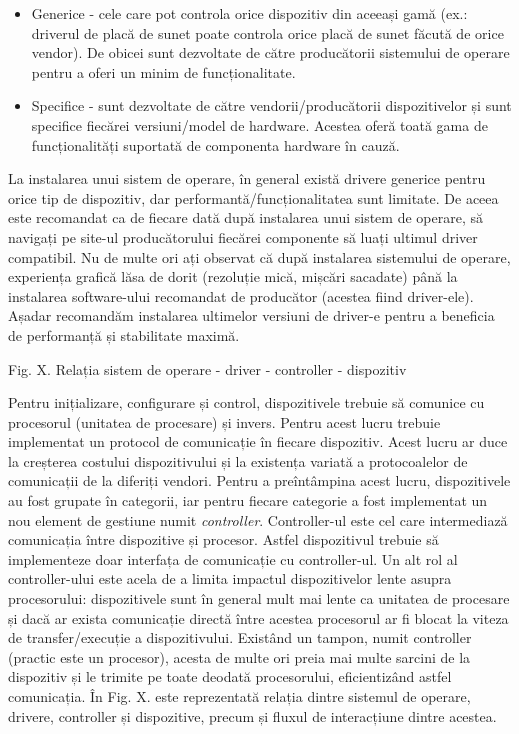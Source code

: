 \begin{itemize}
	\item Generice - cele care pot controla orice dispozitiv din aceeași
		gamă (ex.: driverul de placă de sunet poate controla orice placă
		de sunet făcută de orice vendor). De obicei sunt dezvoltate de
		către producătorii sistemului de operare pentru a oferi un minim
		de funcționalitate.
	\item Specifice - sunt dezvoltate de către vendorii/producătorii
		dispozitivelor și sunt specifice fiecărei versiuni/model de
		hardware. Acestea oferă toată gama de funcționalități suportată
		de componenta hardware în cauză.
\end{itemize}


La instalarea unui sistem de operare, în general există drivere generice pentru
orice tip de dispozitiv, dar performantă/funcționalitatea sunt limitate. De
aceea este recomandat ca de fiecare dată după instalarea unui sistem de operare,
să navigați pe site-ul producătorului fiecărei componente să luați ultimul
driver compatibil. Nu de multe ori ați observat că după instalarea sistemului de
operare, experiența grafică lăsa de dorit (rezoluție mică, mișcări sacadate)
până la instalarea software-ului recomandat de producător (acestea fiind
driver-ele). Așadar recomandăm instalarea ultimelor versiuni de driver-e pentru
a beneficia de performanță și stabilitate maximă.

Fig. X. Relația sistem de operare - driver - controller - dispozitiv

Pentru inițializare, configurare și control, dispozitivele trebuie să comunice
cu procesorul (unitatea de procesare) și invers. Pentru acest lucru trebuie
implementat un protocol de comunicație în fiecare dispozitiv. Acest lucru ar
duce la creșterea costului dispozitivului și la existența variată a
protocoalelor de comunicații de la diferiți vendori. Pentru a preîntâmpina acest
lucru, dispozitivele au fost grupate în categorii, iar pentru fiecare categorie
a fost implementat un nou element de gestiune numit \textit{controller}. Controller-ul
este cel care intermediază comunicația între dispozitive și procesor. Astfel
dispozitivul trebuie să implementeze doar interfața de comunicație cu
controller-ul. Un alt rol al controller-ului este acela de a limita impactul
dispozitivelor lente asupra procesorului: dispozitivele sunt în general mult mai
lente ca unitatea de procesare și dacă ar exista comunicație directă între
acestea procesorul ar fi blocat la viteza de transfer/execuție a dispozitivului.
Existând un tampon, numit controller (practic este un procesor), acesta de multe
ori preia mai multe sarcini de la dispozitiv și le trimite pe toate deodată
procesorului, eficientizând astfel comunicația. În Fig. X. este reprezentată
relația dintre sistemul de operare, drivere, controller și dispozitive, precum
și fluxul de interacțiune dintre acestea.


